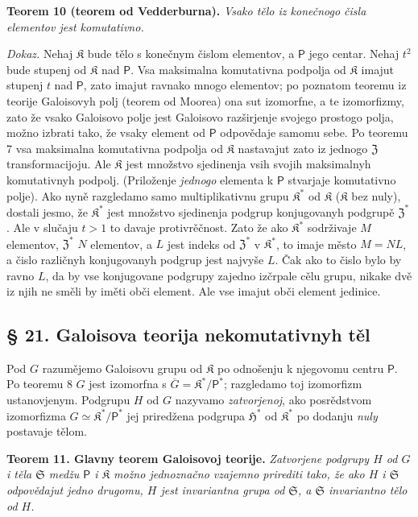 \documentclass[11pt]{article}
\begin{document}
\textbf{Teorem 10 (teorem od Vedderburna).} \emph{Vsako tělo iz konečnogo čisla elementov jest komutativno.}

\emph{Dokaz.} Nehaj \(\mathfrak K\) bude tělo s konečnym čislom elementov, a \(\mathsf P\) jego centar. Nehaj \(t^2\) bude stupenj od \(\mathfrak K\) nad \(\mathsf P\). Vsa maksimalna komutativna podpolja od \(\mathfrak K\) imajut stupenj \(t\) nad \(\mathsf P\), zato imajut ravnako mnogo elementov; po poznatom teoremu iz teorije Galoisovyh polj (teorem od Moorea) ona sut izomorfne, a te izomorfizmy, zato že vsako Galoisovo polje jest Galoisovo razširjenje svojego prostogo polja, možno izbrati tako, že vsaky element od \(\mathsf P\) odpovědaje samomu sebe. Po teoremu 7 vsa maksimalna komutativna podpolja od \(\mathfrak K\) nastavajut zato iz jednogo \(\mathfrak Z\) transformacijoju. Ale \(\mathfrak K\) jest množstvo sjedinenja vsih svojih maksimalnyh komutativnyh podpolj. (Priloženje \emph{jednogo} elementa k \(\mathsf P\) stvarjaje komutativno polje). Ako nyně razgledamo samo multiplikativnu grupu \(\mathfrak K^*\) od \(\mathfrak K\) (\(\mathfrak K\) bez nuly), dostali jesmo, že \(\mathfrak K^*\) jest množstvo sjedinenja podgrup konjugovanyh podgrupě \(\mathfrak Z^*\). Ale v slučaju \(t>1\) to davaje protivrěčnost. Zato že ako \(\mathfrak K^*\) sodrživaje \(M\) elementov, \(\mathfrak Z^*\) \(N\) elementov, a \(L\) jest indeks od \(\mathfrak Z^*\) v \(\mathfrak K^*\), to imaje město \(M=NL\), a čislo različnyh konjugovanyh podgrup jest najvyše \(L\). Čak ako to čislo bylo by ravno \(L\), da by vse konjugovane podgrupy zajedno izčrpale cělu grupu, nikake dvě iz njih ne směli by iměti obči element. Ale vse imajut obči element jedinice.

\subsection*{§ 21. Galoisova teorija nekomutativnyh těl}\label{die-galoissche-theorie-der-nichtkommutativen-koerper}

Pod \(G\) razumějemo Galoisovu grupu od \(\mathfrak K\) po odnošenju k njegovomu centru \(\mathsf P\). Po teoremu 8 \(G\) jest izomorfna s \(\overline G=\mathfrak K^*/\mathsf P^*\); razgledamo toj izomorfizm ustanovjenym. Podgrupu \(H\) od \(G\) nazyvamo \emph{zatvorjenoj}, ako posrědstvom izomorfizma \(G\simeq\mathfrak K^*/\mathsf P^*\) jej priredžena podgrupa \(\mathfrak H^*\) od \(\mathfrak K^*\) po dodanju \emph{nuly} postavaje tělom.


\textbf{Teorem 11. Glavny teorem Galoisovoj teorije.} \emph{Zatvorjene podgrupy \(H\) od \(G\) i těla \(\mathfrak S\) medžu \(\mathsf P\) i \(\mathfrak K\) možno jednoznačno vzajemno prirediti tako, že ako \(H\) i \(\mathfrak S\) odpovědajut jedno drugomu, \(H\) jest invariantna grupa od \(\mathfrak S\), a \(\mathfrak S\) invariantno tělo od \(H\).}
\end{document}
